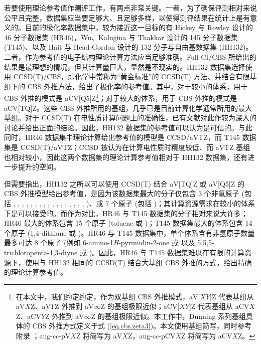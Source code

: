 若要使用理论参考值作测评工作，有两点非常关键。一者，为了确保评测相对来说公平且完整，数据集应当要足够大、且足够多样，以使得测评结果在统计上是有意义的。目前的极化率数据集中，较为接近这一目标的有 Hickey 与 Rowley 设计的 46 分子数据集 (HR46)\cite{Hickey-Rowley.JPCA.2014}，Wu、Kalugina 与 Thakkar 设计的 145 分子数据集 (T145)\cite{Wu-Thakkar.CPL.2015}、以及 Hait 与 Head-Gordon 设计的 132 分子与自由基数据集 (HH132)\cite{Hait-Head-Gordon.PCCP.2018}。二者，作为参考值的电子结构理论计算方法应当足够准确。Full-CI/CBS 所给出的结果是最理想的情况，但其计算量巨大，显然是不现实的。HH132 数据集选择使用 CCSD(T)/CBS，即化学中常称为“黄金标准”的 CCSD(T) 方法、并结合有限基组下的 CBS 外推方法\cite{Nyden-Petersson.JCP.1981, Petersson-Mantzaris.JCP.1988}，给出了极化率的参考值。其中，对于较小的体系，用于 CBS 外推的模式是 aCV[Q5]Z\footnote{在本文中，我们约定约定，作为双基组 CBS 外推模式，aV[$XY$]Z 代表基组从 aV$X$Z、aV$Y$Z 外推到 aV$\infty$Z 的基组极限近似；aCV[$XY$]Z 代表基组从 aCV$X$Z、aCV$Y$Z 外推到 aV$\infty$Z 的基组极限近似。本工作中，Dunning 系列基组具体的 CBS 外推方式定义于式 (\ref{eq.cbs.zeta3})。本文使用基组简写，同时参考附录 ；aug-cc-pV$X$Z 将简写为 aV$X$Z，aug-cc-pCV$X$Z 将简写为 aCV$X$Z。}；对于较大的体系，用于 CBS 外推的模式是 aCV[TQ]Z\cite{Hait-Head-Gordon.PCCP.2018, Hait-Head-Gordon.JCTC.2018}。这些 CBS 外推所用的基组，几乎已是目前计算化学通常所用的最大基组。对于 CCSD(T) 在电性质计算问题上的准确性，已有文献对此作较为深入的讨论并给出正面的结论\cite{Halkier-Joergensen.JCP.1999, Monten-Deleuze.MP.2011, Hait-Head-Gordon.JCTC.2018}。因此，HH132 数据集的参考值可以认为是可信的。与此同时，HR46 数据集中理论计算给出参考值的模型是 CCSD/aVTZ，而 T145 数据集是 CCSD(T)/aVTZ；CCSD 被认为在计算电性质时精度较低、而 aVTZ 基组也相对较小，因此这两个数据集的理论计算参考值相对于 HH132 数据集，还有进一步提升的空间。

但需要指出，HH132 之所以可以使用 CCSD(T) 结合 aV[TQ]Z 或 aV[Q5]Z 的 CBS 外推模型给出参考值，是因为该数据集最大的分子仅包含 3 个非氢原子 (包括 , , , , , , , , , , , , , , , , , )、或 7 个原子 (包括 )；其计算资源需求在较小的体系下是可以接受的。而作为对比，HR46 与 T145 数据集的分子相对来说大许多；HR46 最大的体系包含 15 个原子 (toluene 或 )；T145 数据集最大的体系包含 14 个原子 (1,4-dithiane 或 )。HR46 与 T145 数据集中，单个体系含有非氢原子数量最多可达 8 个原子 (例如 6-amino-1\textit{H}-pyrimidin-2-one 或  以及 5,5,5-trichloropenta-1,3-diyne 或 )。因此，HR46 与 T145 数据集难以在有限的计算资源下，使用与 HH132 相同的 CCSD(T) 结合大基组 CBS 外推的方式，给出精确的理论计算参考值。

